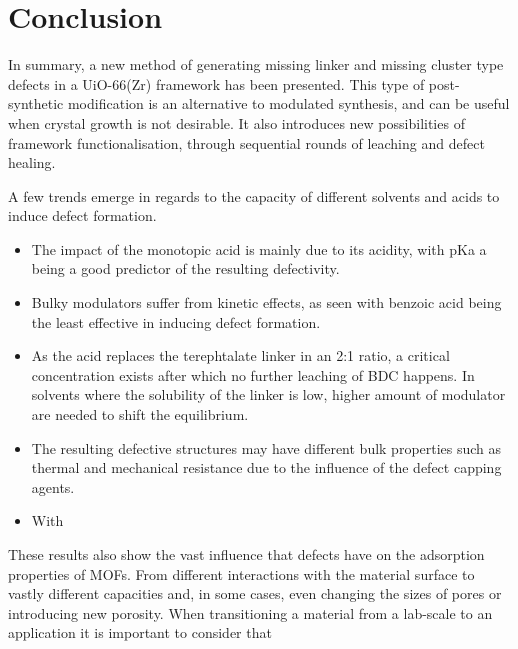 
\section{Conclusion}

\FloatBarrier%
\pagebreak

In summary, a new method of generating missing linker and missing
cluster type defects in a UiO-66(Zr) framework has been presented.
This type of post-synthetic modification is an alternative to 
modulated synthesis, and can be useful when crystal growth is
not desirable. It also introduces new possibilities of framework
functionalisation, through sequential rounds of leaching and 
defect healing.

A few trends emerge in regards to the capacity of different solvents 
and acids to induce defect formation.

\begin{itemize}
    \item The impact of the monotopic acid is mainly due to its 
    acidity, with pKa a being a good predictor of the 
    resulting defectivity.
    \item Bulky modulators suffer from kinetic effects, as seen
    with benzoic acid being the least effective in inducing 
    defect formation.
    \item As the acid replaces the
    terephtalate linker in an 2:1 ratio, a critical
    concentration exists after which no further leaching of 
    BDC happens. In solvents where the solubility of 
    the linker is low, higher amount of modulator are 
    needed to shift the equilibrium.
    \item The resulting defective structures may have different 
    bulk properties such as thermal and mechanical resistance due 
    to the influence of the defect capping agents.
    \item With

\end{itemize}

These results also show the vast influence that defects have on the 
adsorption properties of MOFs. From different interactions with 
the material surface to vastly different capacities and, in some 
cases, even changing the sizes of pores or introducing new porosity.
When transitioning a material from a lab-scale to an application
it is important to consider that 